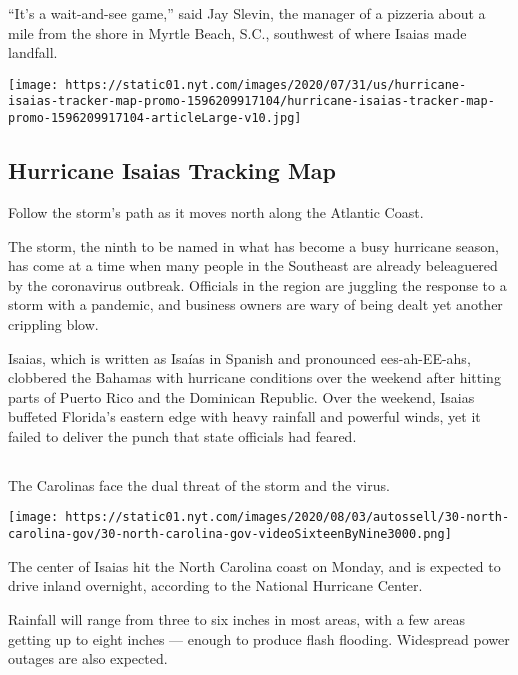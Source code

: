 ``It's a wait-and-see game,'' said Jay Slevin, the manager of a pizzeria
about a mile from the shore in Myrtle Beach, S.C., southwest of where
Isaias made landfall.

\href{https://www.nytimes.com/interactive/2020/07/31/us/hurricane-isaias-tracker-map.html}{}

\texttt{[image: https://static01.nyt.com/images/2020/07/31/us/hurricane-isaias-tracker-map-promo-1596209917104/hurricane-isaias-tracker-map-promo-1596209917104-articleLarge-v10.jpg]}

\hypertarget{hurricane-isaias-tracking-map}{%
\subsection{Hurricane Isaias Tracking
Map}\label{hurricane-isaias-tracking-map}}

Follow the storm's path as it moves north along the Atlantic Coast.

The storm, the ninth to be named in what has become a busy hurricane
season, has come at a time when many people in the Southeast are already
beleaguered by the coronavirus outbreak. Officials in the region are
juggling the response to a storm with a pandemic, and business owners
are wary of being dealt yet another crippling blow.

Isaias, which is written as Isaías in Spanish and pronounced
ees-ah-EE-ahs, clobbered the Bahamas with hurricane conditions over the
weekend after hitting parts of Puerto Rico and the Dominican Republic.
Over the weekend, Isaias buffeted Florida's eastern edge with heavy
rainfall and powerful winds, yet it failed to deliver the punch that
state officials had feared.

\hypertarget{-1}{%
\subsection{}\label{-1}}

The Carolinas face the dual threat of the storm and the virus.

\texttt{[image: https://static01.nyt.com/images/2020/08/03/autossell/30-north-carolina-gov/30-north-carolina-gov-videoSixteenByNine3000.png]}

The center of Isaias hit the North Carolina coast on Monday, and is
expected to drive inland overnight, according to the National Hurricane
Center.

Rainfall will range from three to six inches in most areas, with a few
areas getting up to eight inches --- enough to produce flash flooding.
Widespread power outages are also expected.

